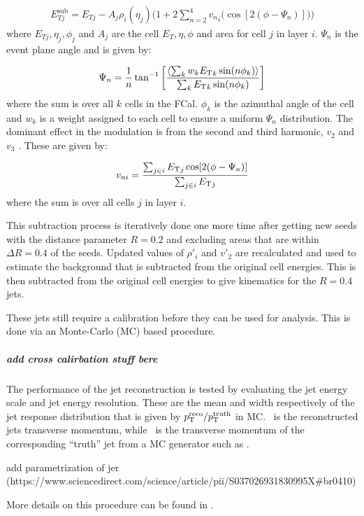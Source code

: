 \begin{align}
E_{Tj}^{\mathrm{sub}} = E_{Tj} - A_j \rho_i (\eta_j) \Big(1+2 \sum_{n=2}^{4} {v_{n}}_i \big(\cos[2(\phi-\Psi_n)] \big) \Big)
\end{align}
where $E_{Tj} , \eta_j, \phi_j$ and $A_j$ are the cell $E_T, \eta, \phi$ and area for cell $j$ in layer $i$.
$\Psi_n$ is the event plane angle and is given by:

\begin{align}
\Psi_n = \frac{1}{n} \tan^{-1} \left[ \frac{\langle \sum_k w_k \mbox{$E_{\mathrm{T}}$}_k \sin(n\phi_k) \rangle}{\sum_k \mbox{$E_{\mathrm{T}}$}_k \sin(n\phi_k)} \right]
\end{align}
where the sum is over all $k$ cells in the FCal. $\phi_k$ is the azimuthal angle of the cell and $w_k$ is a weight assigned to each cell to ensure a uniform $\Psi_n$ distribution. 
The dominant effect in the modulation is from the second and third harmonic, $v_2$ and $v_3$ \cite{ATLAS:2012at}.
These are given by:

\begin{align}
v_{ni} = \frac{\sum_{j \in i} \mbox{$E_{\mathrm{T}}$}_j \cos[2(\phi-\Psi_n)]}{\sum_{j \in i} \mbox{$E_{\mathrm{T}}$}_j}
\end{align}
where the sum is over all cells $j$ in layer $i$.

This subtraction process is iteratively done one more time after getting new seeds with the distance parameter $R = 0.2$ and excluding areas that are within $\Delta R = 0.4$ of the seeds.
Updated values of $\rho{'}_i$ and $v{'}_2$ are recalculated and used to estimate the background that is subtracted from the original cell energies.
This is then subtracted from the original cell energies to give kinematics for the $R= 0.4$ jets.

These jets still require a calibration before they can be used for analysis.
This is done via an Monte-Carlo (MC) based procedure.
\subparagraph{add cross calirbation stuff bere}
The performance of the jet reconstruction is tested by evaluating the jet energy scale and jet energy resolution.
These are the mean and width respectively of the jet response distribution that is given by $\mbox{$p_{\mathrm{T}}^{\mathrm{reco}}$} / \mbox{$p_{\mathrm{T}}^{\mathrm{truth}}$}$ in MC.
\ptreco\ is the reconstructed jets transverse momentum, while \pttruth\ is the transverse momentum of the corresponding ``truth'' jet from a MC generator such as .

add parametrization of jer (https://www.sciencedirect.com/science/article/pii/S037026931830995X#br0410)


More details on this procedure can be found in \cite{2013220}.




